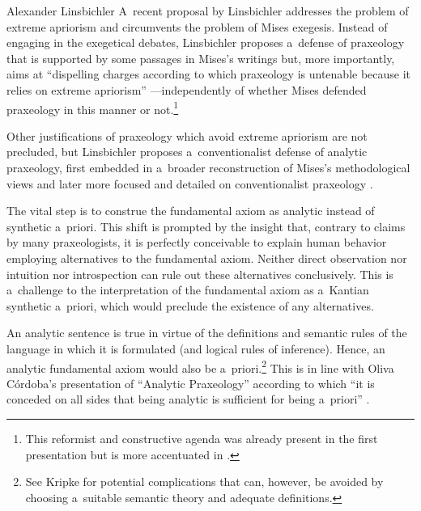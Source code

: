 \begin{artengenv}{Alexander Linsbichler}
A~recent proposal by Linsbichler 
\parencites[][]{linsbichler_was_2017}[][]{linsbichler_austrian_2021} %
 addresses the problem of extreme apriorism and circumvents the problem of Mises exegesis. Instead of engaging in the exegetical debates, Linsbichler proposes a~defense of praxeology that is supported by some passages in Mises's writings but, more importantly, aims at ``dispelling charges according to which praxeology is untenable because it relies on extreme apriorism'' 
\parencite[][p.204]{linsbichler_otto_2021}%
---independently of whether Mises defended praxeology in this manner or not.\footnote{This reformist and constructive agenda was already present in the first presentation 
\parencite[][see e~.g. p.124]{linsbichler_was_2017} %
 but is more accentuated in 
\parencites[][]{linsbichler_austrian_2021}[][]{linsbichler_otto_2021}.%
}



Other justifications of praxeology which avoid extreme apriorism are not precluded, but Linsbichler 
\parencite*[][]{linsbichler_was_2017} %
 proposes a~conventionalist defense of analytic praxeology, first embedded in a~broader reconstruction of Mises's methodological views and later more focused and detailed on conventionalist praxeology 
\parencite[][]{linsbichler_austrian_2021}.%




The vital step is to construe the fundamental axiom as analytic instead of synthetic a~priori. This shift is prompted by the insight that, contrary to claims by many praxeologists, it is perfectly conceivable to explain human behavior employing alternatives to the fundamental axiom. Neither direct observation nor intuition nor introspection can rule out these alternatives conclusively. This is a~challenge to the interpretation of the fundamental axiom as a~Kantian synthetic a~priori, which would preclude the existence of any alternatives.



An analytic sentence is true in virtue of the definitions and semantic rules of the language in which it is formulated (and logical rules of inference). Hence, an analytic fundamental axiom would also be a~priori.\footnote{See Kripke 
\parencites[][]{kripke_naming_1972}[][pp.122–123]{kripke_naming_1980} %
 for potential complications that can, however, be avoided by choosing a~suitable semantic theory and adequate definitions. } This is in line with Oliva Córdoba's presentation of ``Analytic Praxeology'' according to which ``it is conceded on all sides that being analytic is sufficient for being a~priori'' 
\parencites[][p.528]{oliva_cordoba_uneasiness_2017}[see also 523,][]{oliva_cordoba_uneasiness_2017}.%





\end{artengenv}

